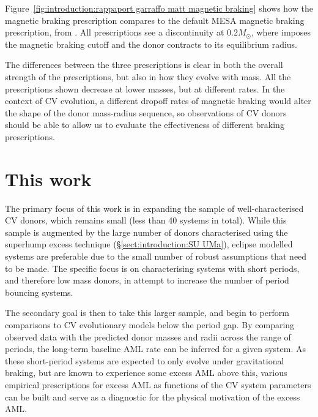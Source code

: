 Figure~\ref{fig:introduction:rappaport garraffo matt magnetic braking} shows how the \citet{matt2015} magnetic braking prescription compares to the default MESA magnetic braking prescription, from \citet{rappaport1983}. All prescriptions see a discontinuity at $0.2M_\odot$, where \citet{knigge11} imposes the magnetic braking cutoff and the donor contracts to its equilibrium radius.

The differences between the three prescriptions is clear in both the overall strength of the prescriptions, but also in how they evolve with mass. All the prescriptions shown decrease at lower masses, but at different rates. In the context of CV evolution, a different dropoff rates of magnetic braking would alter the shape of the donor mass-radius sequence, so observations of CV donors should be able to allow us to evaluate the effectiveness of different braking prescriptions.



\section{This work}
\label{sect:introduction:this work}

The primary focus of this work is in expanding the sample of well-characterised CV donors, which remains small (less than 40 systems in total). While this sample is augmented by the large number of donors characterised using the superhump excess technique (\S\ref{sect:introduction:SU UMa}), eclipse modelled systems are preferable due to the small number of robust assumptions that need to be made. The specific focus is on characterising systems with short periods, and therefore low mass donors, in attempt to increase the number of period bouncing systems.

The secondary goal is then to take this larger sample, and begin to perform comparisons to CV evolutionary models below the period gap. By comparing observed data with the predicted donor masses and radii across the range of periods, the long-term baseline AML rate can be inferred for a given system. As these short-period systems are expected to only evolve under gravitational braking, but are known to experience some excess AML above this, various empirical prescriptions for excess AML as functions of the CV system parameters can be built and serve as a diagnostic for the physical motivation of the excess AML.
